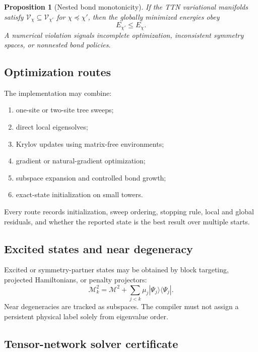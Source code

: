 \documentclass[11pt]{article}
\newtheorem{proposition}[definition]{Proposition}
\newcommand{\cM}{\mathcal M}
\newcommand{\cV}{\mathcal V}
\begin{document}
\begin{proposition}[Nested bond monotonicity]
If the TTN variational manifolds satisfy
\(\cV_{\chi}\subseteq\cV_{\chi'}\) for
\(\chi\preceq\chi'\), then the globally minimized energies obey
\begin{equation}
 E_{\chi'}\leq E_{\chi}.
\label{eq:bond-monotonicity}
\end{equation}
A numerical violation signals incomplete optimization, inconsistent symmetry
spaces, or nonnested bond policies.
\end{proposition}

\subsection{Optimization routes}

The implementation may combine:
\begin{enumerate}
 \item one-site or two-site tree sweeps;
 \item direct local eigensolves;
 \item Krylov updates using matrix-free environments;
 \item gradient or natural-gradient optimization;
 \item subspace expansion and controlled bond growth;
 \item exact-state initialization on small towers.
\end{enumerate}
Every route records initialization, sweep ordering, stopping rule, local and
global residuals, and whether the reported state is the best result over
multiple starts.

\subsection{Excited states and near degeneracy}

Excited or symmetry-partner states may be obtained by block targeting,
projected Hamiltonians, or penalty projectors:
\begin{equation}
 \cM_k^2
 =
 \cM^2+
 \sum_{j<k}\mu_j|\Psi_j\rangle\langle\Psi_j|.
\label{eq:excited-penalty}
\end{equation}
Near degeneracies are tracked as subspaces.  The compiler must not assign a
persistent physical label solely from eigenvalue order.

\subsection{Tensor-network solver certificate}
\end{document}
